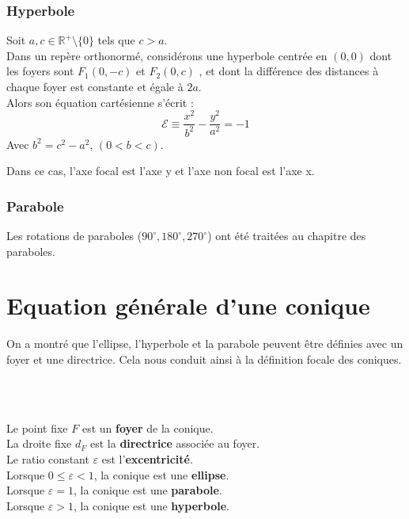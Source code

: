 \subsubsection{Hyperbole}
\begin{tcolorbox}[colback=cyan!5, colframe=cyan!70!blue, title=Equation cartésienne d'une hyperbole de centre {$(0,0)$} avec une rotation de {$\dfrac{\pi}{2}$}.]
Soit $a, c \in \mathbb{R}^+\setminus\{0\}$ tels que $c > a$.\\
 Dans un repère orthonormé, 
 considérons une hyperbole centrée en $(0, 0)$ dont les foyers sont $F_1 (0,-c)$ et $F_2 (0,c)$
, et dont la différence des distances à chaque foyer 
est constante et égale à $2a$.\\ Alors son équation cartésienne s'écrit :
\begin{equation}
\mathcal{E} \equiv \dfrac{x^2}{b^2} - \dfrac{y^2}{a^2} = -1
\end{equation}
Avec $b^2 = c^2 - a^2$, $(0<b<c)$.
\end{tcolorbox}
Dans ce cas, l'axe focal est l'axe y et l'axe non focal est l'axe x.

\subsubsection{Parabole}
Les rotations de paraboles ($90^\circ, 180^\circ, 270^\circ$) ont été traitées au chapitre des paraboles.

\newpage
\section{Equation générale d'une conique}\label{section:generale}

On a montré que l'ellipse, l'hyperbole et la parabole peuvent être définies avec un foyer et une directrice.
Cela nous conduit ainsi à la définition focale des coniques.
\begin{tcolorbox}[colback=cyan!5, colframe=cyan!70!blue, title=Définition focale des coniques]
\label{def:conique_mono}
\\~

Le point fixe $F$ est un \textbf{foyer} de la conique.\\
La droite fixe $d_F$ est la \textbf{directrice} associée au foyer.\\
Le ratio constant $\varepsilon$ est l'\textbf{excentricité}.\\

Lorsque $0\leq \varepsilon<1$, la conique est une \textbf{ellipse}.\\
Lorsque $\varepsilon=1$, la conique est une \textbf{parabole}.\\
Lorsque $\varepsilon>1$, la conique est une \textbf{hyperbole}.\\
\end{tcolorbox}

